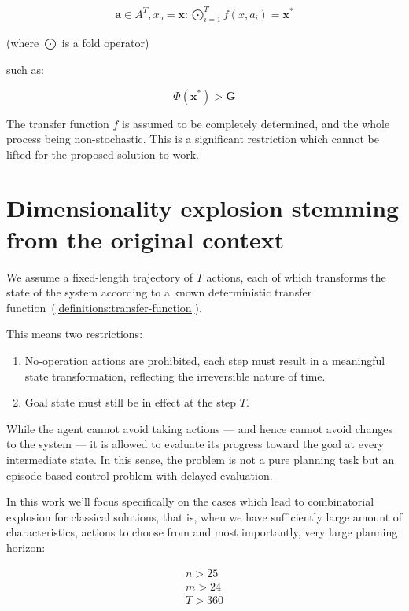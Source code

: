 \documentclass[12pt, a4paper]{report}
\begin{document}
	\begin{eqnarray}\label{definitions:fold}
		\mathbf{a} \in A^T, x_o = \mathbf{x}: \bigodot_{i=1}^{T} f(x, a_i) = \mathbf{x}^*
	\end{eqnarray}
	
	(where $\bigodot$ is a fold operator)
	
	such as:
	
	\begin{equation}
		\Phi(\mathbf{x}^*) > \mathbf{G}
	\end{equation}
	
	The transfer function $f$ is assumed to be completely determined, and the whole process being non-stochastic. This is a significant restriction which cannot be lifted for the proposed solution to work.

	\section{Dimensionality explosion stemming from the original context}

	We assume a fixed-length trajectory of $𝑇$ actions, each of which transforms the state of the system according to a known deterministic transfer function~(\ref{definitions:transfer-function}).

	This means two restrictions:
	
	\begin{enumerate}
		\item No-operation actions are prohibited, each step must result in a meaningful state transformation, reflecting the irreversible nature of time.
		\item Goal state must still be in effect at the step $T$.
	\end{enumerate}

	While the agent cannot avoid taking actions — and hence cannot avoid changes to the system — it is allowed to evaluate its progress toward the goal at every intermediate state.
	In this sense, the problem is not a pure planning task but an episode-based control problem with delayed evaluation.
	
	In this work we'll focus specifically on the cases which lead to combinatorial explosion for classical solutions, that is, when we have sufficiently large amount of characteristics, actions to choose from and most importantly, very large planning horizon:
	
	\begin{eqnarray}
		n > 25 \\
		m > 24 \\
		T > 360
	\end{eqnarray}
	
\end{document}
